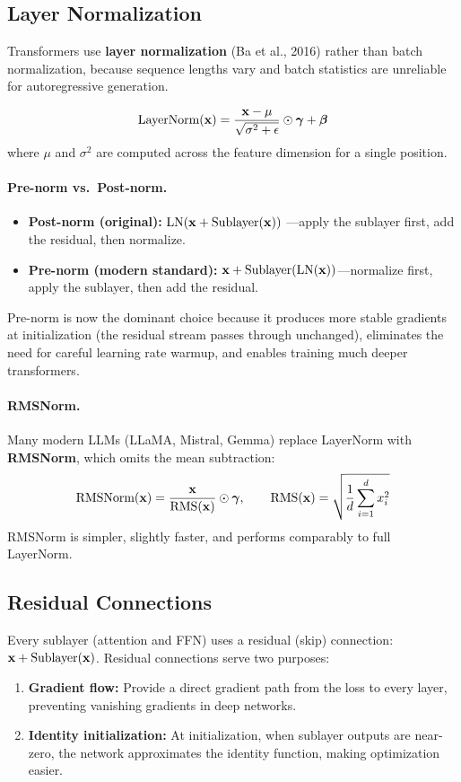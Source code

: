 \subsection{Layer Normalization}

Transformers use \textbf{layer normalization} (Ba et al., 2016) rather than
batch normalization, because sequence lengths vary and batch statistics are
unreliable for autoregressive generation.

\[
    \text{LayerNorm}(\mathbf{x}) = \frac{\mathbf{x} - \mu}{\sqrt{\sigma^2 + \epsilon}} \odot \bm{\gamma} + \bm{\beta}
\]
where $\mu$ and $\sigma^2$ are computed across the feature dimension for a
single position.

\paragraph{Pre-norm vs.\ Post-norm.}
\begin{itemize}
    \item \textbf{Post-norm (original):} $\text{LN}(\mathbf{x} + \text{Sublayer}(\mathbf{x}))$
          ---apply the sublayer first, add the residual, then normalize.
    \item \textbf{Pre-norm (modern standard):}
          $\mathbf{x} + \text{Sublayer}(\text{LN}(\mathbf{x}))$---normalize first, apply
          the sublayer, then add the residual.
\end{itemize}

Pre-norm is now the dominant choice because it produces more stable gradients
at initialization (the residual stream passes through unchanged), eliminates
the need for careful learning rate warmup, and enables training much deeper
transformers.

\paragraph{RMSNorm.}
Many modern LLMs (LLaMA, Mistral, Gemma) replace LayerNorm with
\textbf{RMSNorm}, which omits the mean subtraction:
\[
    \text{RMSNorm}(\mathbf{x}) = \frac{\mathbf{x}}{\text{RMS}(\mathbf{x})} \odot \bm{\gamma},
    \qquad
    \text{RMS}(\mathbf{x}) = \sqrt{\frac{1}{d}\sum_{i=1}^{d} x_i^2}
\]
RMSNorm is simpler, slightly faster, and performs comparably to full LayerNorm.

\subsection{Residual Connections}

Every sublayer (attention and FFN) uses a residual (skip) connection:
$\mathbf{x} + \text{Sublayer}(\mathbf{x})$.  Residual connections serve two purposes:
\begin{enumerate}
    \item \textbf{Gradient flow:} Provide a direct gradient path from the loss
          to every layer, preventing vanishing gradients in deep networks.
    \item \textbf{Identity initialization:} At initialization, when sublayer
          outputs are near-zero, the network approximates the identity function,
          making optimization easier.
\end{enumerate}


